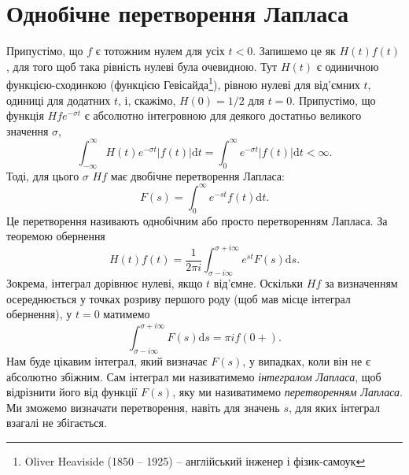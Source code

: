 \documentclass[14pt,twoside]{extreport}
\theoremstyle{mystyle}
\numberwithin{equation}{chapter}
\begin{document}
%
%

\section{Однобічне перетворення Лапласа}

Припустімо, що $f$ є тотожним нулем для усіх $t<0$. Запишемо це як $H(t)f(t)$, для того щоб така рівність нулеві була очевидною. Тут $H(t)$ є одиничною функцією-сходинкою (функцією Гевісайда\footnote{Oliver Heaviside (1850 -- 1925) -- англійський інженер і фізик-самоук}), рівною нулеві для від'ємних $t$, одиниці для додатних $t$, і, скажімо, $H(0)=1/2$ для $t=0$. Припустімо, що функція $Hfe^{-\sigma t}$ є абсолютно інтегровною для деякого достатньо великого значення $\sigma$,
\begin{equation*}
	\displaystyle \int_{-\infty}^{\infty}H(t)e^{-\sigma t}|f(t)|\mathrm{d}t=\int_{0}^{\infty}e^{-\sigma t}|f(t)|\mathrm{d}t<\infty.
\end{equation*}
Тоді, для цього $\sigma$ $Hf$ має двобічне перетворення Лапласа:
\begin{equation*}
	\displaystyle F(s)=\int_{0}^{\infty}e^{-st}f(t)\mathrm{d}t.
\end{equation*}
Це перетворення називають однобічним або просто перетворенням Лапласа. За теоремою обернення
\begin{equation*}
	H(t)f(t)=\dfrac{1}{2 \pi i}\int_{\sigma-i\infty}^{\sigma+i\infty}e^{st}F(s)\mathrm{d}s.
\end{equation*}
Зокрема, інтеграл дорівнює нулеві, якщо $t$ від'ємне. Оскільки $Hf$ за визначенням осереднюється у точках розриву першого роду (щоб мав місце інтеграл обернення), у $t=0$ матимемо
\begin{equation*}
	\displaystyle \int_{\sigma-i\infty}^{\sigma+i\infty}F(s)\mathrm{d}s=\pi if(0+).
\end{equation*}
Нам буде цікавим інтеграл, який визначає $F(s)$, у випадках, коли він не є абсолютно збіжним. Сам інтеграл ми називатимемо \emph{інтегралом Лапласа}, щоб відрізнити його від функції $F(s)$, яку ми називатимемо \emph{перетворенням Лапласа}. Ми зможемо визначати перетворення, навіть для значень $s$, для яких інтеграл взагалі не збігається.
\end{document}
